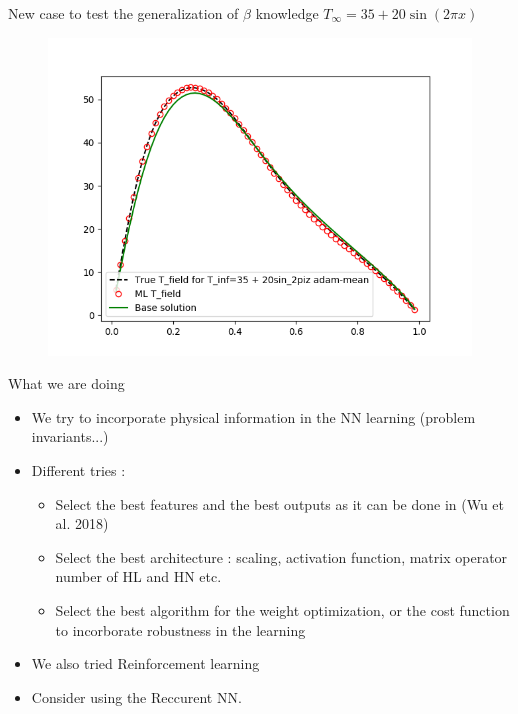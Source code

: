\documentclass[10pt,
			   xcolor=svgnames,
			   hyperref={linkcolor=red, citecolor = DarkGreen, colorlinks=true, urlcolor=Navy}] {beamer}
\newcommand{\warrow}{\item[\color{blue!50!black!70} \tiny{\ding{109}}]}
\newcommand{\sarrow}{\item[\color{blue!50!black!70!orange!60} \tiny{\ding{55}}]}
\begin{document}
\begin{frame}{New case to test the generalization of $\beta$ knowledge}
	$T_\infty = 35 + 20\sin(2\pi x)$ 
	\begin{figure}[H]
		\centering	
		\includegraphics[scale=0.5]{T_True_vs_T_ML_N_sample_5_T_inf_35_+_20sin_2piz_adam-mean.png}
	\end{figure}
\end{frame}

\begin{frame}{What we are doing}
	\begin{itemize}
		\sarrow We try to incorporate physical information in the NN learning (problem invariants...)
		\sarrow Different tries :
			\begin{itemize}
				\warrow Select the best features and the best outputs as it can be done in (Wu et al. 2018)
				\warrow Select the best architecture : scaling, activation function, matrix operator number of HL and HN etc.
				\warrow Select the best algorithm for the weight optimization, or the cost function to incorborate robustness in the learning
			\end{itemize}
		\sarrow We also tried Reinforcement learning 
		\sarrow Consider using the Reccurent NN.
	\end{itemize}
\end{frame}
\end{document}
